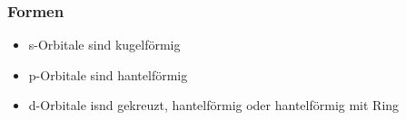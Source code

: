\subsubsection{Formen}
\begin{itemize}
    \item s-Orbitale sind kugelförmig
    \item p-Orbitale sind hantelförmig
    \item d-Orbitale isnd gekreuzt, hantelförmig oder hantelförmig mit Ring
\end{itemize}
